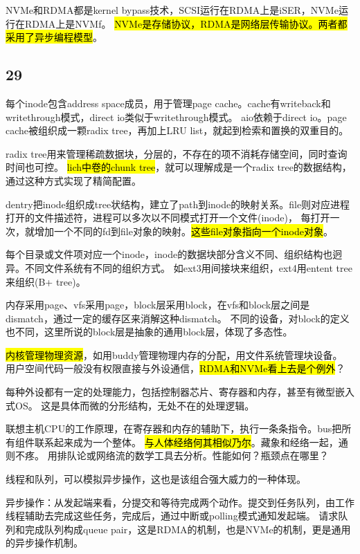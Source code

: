 NVMe和RDMA都是kernel bypass技术，SCSI运行在RDMA上是iSER，NVMe运行在RDMA上是NVMf。
\hl{NVMe是存储协议，RDMA是网络层传输协议。两者都采用了异步编程模型}。

\subsection{29}

每个inode包含address space成员，用于管理page cache。cache有writeback和writethrough模式，direct io类似于writethrough模式。
aio依赖于direct io。page cache被组织成一颗radix tree，再加上LRU list，就起到检索和置换的双重目的。

radix tree用来管理稀疏数据块，分层的，不存在的项不消耗存储空间，同时查询时间也可控。
\hl{lich中卷的chunk tree}，就可以理解成是一个radix tree的数据结构，通过这种方式实现了精简配置。

dentry把inode组织成tree状结构，建立了path到inode的映射关系。file则对应进程打开的文件描述符，进程可以多次以不同模式打开一个文件(inode)，
每打开一次，就增加一个不同的fd到file对象的映射。\hl{这些file对象指向一个inode对象}。

每个目录或文件项对应一个inode，inode的数据块部分含义不同、组织结构也迥异。不同文件系统有不同的组织方式。
如ext3用间接块来组织，ext4用entent tree来组织(B+ tree)。

内存采用page、vfs采用page，block层采用block，在vfs和block层之间是dismatch，通过一定的缓存区来消解这种dismatch。
不同的设备，对block的定义也不同，这里所说的block层是抽象的通用block层，体现了多态性。

\dotfill

\hl{内核管理物理资源}，如用buddy管理物理内存的分配，用文件系统管理块设备。
用户空间代码一般没有权限直接与外设通信，\hl{RDMA和NVMe看上去是个例外}？

每种外设都有一定的处理能力，包括控制器芯片、寄存器和内存，甚至有微型嵌入式OS。
这是具体而微的分形结构，无处不在的处理逻辑。

联想主机CPU的工作原理，在寄存器和内存的辅助下，执行一条条指令。bus把所有组件联系起来成为一个整体。
\hl{与人体经络何其相似乃尔}。藏象和经络一起，通则不疼。
用排队论或网络流的数学工具去分析。性能如何？瓶颈点在哪里？

\dotfill

线程和队列，可以模拟异步操作，这也是该组合强大威力的一种体现。

异步操作：从发起端来看，分提交和等待完成两个动作。提交到任务队列，由工作线程辅助去完成这些任务，完成后，通过中断或polling模式通知发起端。
请求队列和完成队列构成queue pair，这是RDMA的机制，也是NVMe的机制，更是通用的异步操作机制。


